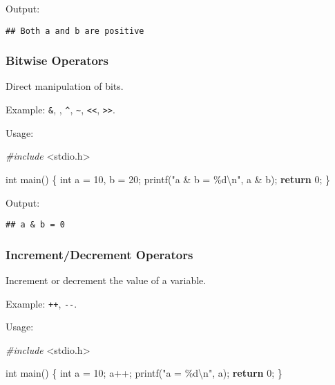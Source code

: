 \documentclass[
]{article}
\newenvironment{Shaded}{\begin{snugshade}}{\end{snugshade}}
\newcommand{\ControlFlowTok}[1]{\textcolor[rgb]{0.13,0.29,0.53}{\textbf{#1}}}
\newcommand{\DataTypeTok}[1]{\textcolor[rgb]{0.13,0.29,0.53}{#1}}
\newcommand{\DecValTok}[1]{\textcolor[rgb]{0.00,0.00,0.81}{#1}}
\newcommand{\ImportTok}[1]{#1}
\newcommand{\NormalTok}[1]{#1}
\newcommand{\PreprocessorTok}[1]{\textcolor[rgb]{0.56,0.35,0.01}{\textit{#1}}}
\newcommand{\SpecialCharTok}[1]{\textcolor[rgb]{0.00,0.00,0.00}{#1}}
\newcommand{\StringTok}[1]{\textcolor[rgb]{0.31,0.60,0.02}{#1}}
\begin{document}
Output:

\begin{verbatim}
## Both a and b are positive
\end{verbatim}

\hypertarget{bitwise-operators}{%
\subsubsection{Bitwise Operators}\label{bitwise-operators}}

Direct manipulation of bits.

Example: \texttt{\&}, \texttt{\textbar{}}, \texttt{\^{}},
\texttt{\textasciitilde{}}, \texttt{\textless{}\textless{}},
\texttt{\textgreater{}\textgreater{}}.

Usage:

\begin{Shaded}
\begin{Highlighting}[]
\PreprocessorTok{\#include }\ImportTok{\textless{}stdio.h\textgreater{}}

\DataTypeTok{int}\NormalTok{ main() \{}
    \DataTypeTok{int}\NormalTok{ a = }\DecValTok{10}\NormalTok{, b = }\DecValTok{20}\NormalTok{;}
\NormalTok{    printf(}\StringTok{"a \& b = \%d}\SpecialCharTok{\textbackslash{}n}\StringTok{"}\NormalTok{, a \& b);}
    \ControlFlowTok{return} \DecValTok{0}\NormalTok{;}
\NormalTok{\}}
\end{Highlighting}
\end{Shaded}

Output:

\begin{verbatim}
## a & b = 0
\end{verbatim}

\hypertarget{incrementdecrement-operators}{%
\subsubsection{Increment/Decrement
Operators}\label{incrementdecrement-operators}}

Increment or decrement the value of a variable.

Example: \texttt{++}, \texttt{-\/-}.

Usage:

\begin{Shaded}
\begin{Highlighting}[]
\PreprocessorTok{\#include }\ImportTok{\textless{}stdio.h\textgreater{}}

\DataTypeTok{int}\NormalTok{ main() \{}
    \DataTypeTok{int}\NormalTok{ a = }\DecValTok{10}\NormalTok{;}
\NormalTok{    a++;}
\NormalTok{    printf(}\StringTok{"a = \%d}\SpecialCharTok{\textbackslash{}n}\StringTok{"}\NormalTok{, a);}
    \ControlFlowTok{return} \DecValTok{0}\NormalTok{;}
\NormalTok{\}}
\end{Highlighting}
\end{Shaded}
\end{document}
